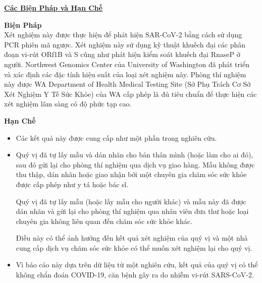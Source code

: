 \documentclass[10pt]{article}
\begin{document}
\bigskip

\large \underline{\textbf{Các Biện Pháp và Hạn Chế}}

\textbf{Biện Pháp}\\
Xét nghiệm này được thực hiện để phát hiện SAR-CoV-2 bằng cách sử dụng PCR phiên
mã ngược. Xét nghiệm này sử dụng kỹ thuật khuếch đại các phân đoạn vi-rút ORf1B
và S cũng như phát hiện kiểm soát khuếch đại RnaseP ở người. Northwest Genomics
Center của University of Washington đã phát triển và xác định các đặc tính hiệu
suất của loại xét nghiệm này. Phòng thí nghiệm này được WA Department of Health
Medical Testing Site (Sở Phụ Trách Cơ Sở Xét Nghiệm Y Tế Sức Khỏe) của WA cấp
phép là đủ tiêu chuẩn để thực hiện các xét nghiệm lâm sàng có độ phức tạp cao.

\textbf{Hạn Chế}

\begin{itemize}

\item

  Các kết quả này được cung cấp như một phần trong nghiên cứu.

\item
  Quý vị đã tự lấy mẫu và dán nhãn cho bản thân mình (hoặc làm cho ai đó), sau
  đó gửi lại cho phòng thí nghiệm qua dịch vụ giao hàng. Mẫu không được thu
  thập, dán nhãn hoặc giao nhận bởi một chuyên gia chăm sóc sức khỏe được cấp
  phép như y tá hoặc bác sĩ.

  Quý vị đã tự lấy mẫu (hoặc lấy mẫu cho người khác) và mẫu này đã được dán nhãn
  và gửi lại cho phòng thí nghiệm qua nhân viên đưa thư hoặc loại chuyên gia
  không liên quan đến chăm sóc sức khỏe khác.



  Điều này có thể ảnh hưởng đến kết quả xét nghiệm của quý vị và một nhà cung
  cấp dịch vụ chăm sóc sức khỏe có thể muốn xét nghiệm lại cho quý vị.

\item

  Vì báo cáo này dựa trên dữ liệu từ một nghiên cứu, kết quả của quý vị có thể
  không chẩn đoán COVID-19, căn bệnh gây ra do nhiễm vi-rút SARS-CoV-2.

\end{itemize}
\end{document}
